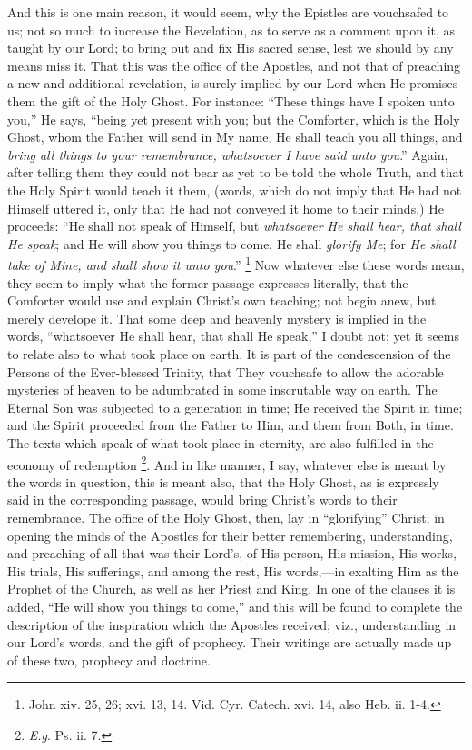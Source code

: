 And this is one main reason, it would seem, why the Epistles are
vouchsafed to us; not so much to increase the Revelation, as to serve
as a comment upon it, as taught by our Lord; to bring out and fix His
sacred sense, lest we should by any means miss it. That this was the
office of the Apostles, and not that of preaching a new and additional
revelation, is surely implied by our Lord when He promises them the
gift of the Holy Ghost. For instance: ``These things have I spoken
unto you,'' He says, ``being yet present with you; but the
Comforter, which is the Holy Ghost, whom the Father will send in My
name, He shall teach you all things, and \emph{bring all things to your
remembrance, whatsoever I have said unto you}.'' Again, after
telling them they could not bear as yet to be told the whole Truth,
and that the Holy Spirit would teach it them, (words, which do not
imply that He had not Himself uttered it, only that He had not
conveyed it home to their minds,) He proceeds: ``He shall not
speak of Himself, but \emph{whatsoever He shall hear, that shall He speak};
and He will show you things to come. He shall \emph{glorify Me}; for \emph{He
shall take of Mine, and shall show it unto you}.'' \footnote{John xiv. 25, 26; xvi. 13, 14. Vid. Cyr.
Catech. xvi. 14, also Heb. ii. 1-4.} Now whatever else these words mean, they seem to imply what the
former passage expresses literally, that the Comforter would use
and explain Christ's own teaching; not begin anew, but merely develope
it. That some deep and heavenly mystery is implied in the words,
``whatsoever He shall hear, that shall He speak,'' I doubt
not; yet it seems to relate also to what took place on earth. It is
part of the condescension of the Persons of the Ever-blessed Trinity,
that They vouchsafe to allow the adorable mysteries of heaven to be
adumbrated in some inscrutable way on earth. The Eternal Son was
subjected to a generation in time; He received the Spirit in time; and
the Spirit proceeded from the Father to Him, and them from Both, in
time. The texts which speak of what took place in eternity, are also
fulfilled in the economy of redemption \footnote{\emph{E.g}. Ps. ii. 7.}. And in like manner, I say, whatever else is meant by the
words in question, this is meant also, that the Holy Ghost, as is
expressly said in the corresponding passage, would bring Christ's
words to their remembrance. The office of the Holy Ghost, then, lay in
``glorifying'' Christ; in opening the minds of the Apostles
for their better remembering, understanding, and preaching of all that
was their Lord's, of His person, His mission, His works, His trials,
His sufferings, and among the rest, His words,—in exalting Him as
the Prophet of the Church, as well as her Priest and King. In one of
the clauses it is added, ``He will show you things to come,''
and this will be found to complete the description of the inspiration
which the Apostles received; viz., understanding in our Lord's words,
and the gift of prophecy. Their writings are actually made up of these
two, prophecy and doctrine.

